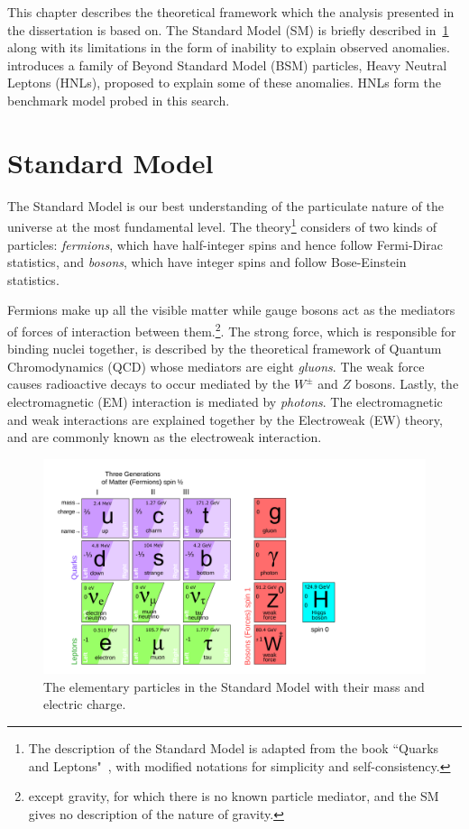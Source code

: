 This chapter describes the theoretical framework which the analysis presented in the dissertation is based on. The Standard Model (SM) is briefly described in~\cref{sec:sm} along with its limitations in the form of inability to explain observed anomalies.~ introduces a family of Beyond Standard Model (BSM) particles, Heavy Neutral Leptons (HNLs), proposed to explain some of these anomalies. HNLs form the benchmark model probed in this search.

\section{Standard Model}\label{sec:sm}
The Standard Model is our best understanding of the particulate nature of the universe at the most fundamental level. The theory\footnote{The description of the Standard Model is adapted from the book ``Quarks and Leptons"~\cite{Halzen:1984mc}, with modified notations for simplicity and self-consistency.} considers of two kinds of particles: \textit{fermions}, which have half-integer spins and hence follow Fermi-Dirac statistics, and \textit{bosons}, which have integer spins and follow Bose-Einstein statistics. 

Fermions make up all the visible matter while gauge bosons act as the mediators of forces of interaction between them.\footnote{except gravity, for which there is no known particle mediator, and the SM gives no description of the nature of gravity.}. The strong force, which is responsible for binding nuclei together, is described by the theoretical framework of Quantum Chromodynamics (QCD) whose mediators are eight \textit{gluons}. The weak force causes radioactive decays to occur mediated by the $W^\pm$ and $Z$ bosons. Lastly, the electromagnetic (EM) interaction is mediated by \textit{photons}. The electromagnetic and weak interactions are explained together by the Electroweak (EW) theory, and are commonly known as the electroweak interaction.

\begin{figure}[!ht]
    \centering
    \includegraphics[width=.8\linewidth]{figures/theory/SM_no_HNL.pdf}
    \caption{The elementary particles in the Standard Model with their mass and electric charge.~\cite{Gninenko2012}}
    \label{fig:sm}
\end{figure}

